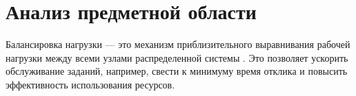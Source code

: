 \chapter{Анализ предметной области}

\begin{comment}
С ростом числа запросов к системе, встает вопрос о ее масштабировании.
Масштабирование — это процесс роста системы со временем, для эффективной
обработки все большего и большего количества запросов в единицу времени \cite{mashtab}.
Выделяют два вида масштабирования: горизонтальное и вертикальное \cite{uzel,mashtabtypes1,mashtabtypes2}. Вертикальное масштабирование происходит за счет увеличения мощности
вычислительного узла. Однако, использования только такого подхода часто
не хватает, поскольку постоянно увеличивая мощность, однажды будет до-
стигнут «потолок» производительности и дальнейшие аппаратные улучшения
будут недоступны. В таком случае для дальнейшего роста производительности
применяют горизонтальное масштабирование, которое заключается в добавле-
нии новых вычислительных узлов, выполняющих одинаковые функции. Для
расширения возможностей горизонтального масштабирования используются
балансировщики нагрузки \cite{mashtabtypes1,mashtabtypes2}.
\end{comment}

Балансировка нагрузки --- это механизм приблизительного выравнивания рабочей нагрузки между всеми узлами распределенной системы \cite{anal}.
Это позволяет ускорить обслуживание заданий, например, свести к минимуму время отклика и повысить эффективность использования ресурсов.
\begin{comment}
	
Некоторые из основных целей алгоритма балансировки нагрузки, как указано в, заключаются в следующем: добиться большего общего улучшения производительности системы при разумных затратах, например, сократить время отклика задачи при сохранении приемлемых задержек; одинаково относиться ко всем заданиям в системе независимо от их происхождения; обладать отказоустойчивостью:
выносливостью производительности при частичном сбое в системе; иметь возможность модифицировать себя в соответствии с любыми изменениями или расширяться в конфигурации распределенной системы; и поддерживать стабильность системы: способность учитывать чрезвычайные ситуации, такие как внезапный всплеск поступлений, чтобы производительность системы не ухудшалась сверх определенного порога, одновременно предотвращая, чтобы узлы распределенной системы тратили слишком много времени на передачу заданий между собой вместо выполнения эти рабочие места. \cite{4}	

Cледует еще четко понимать, о чем идет речь: о распределении или балансировке нагрузки. Несмотря на свою схожесть, эти понятия нельзя назвать взаимозаменяемыми. Так, распределение нагрузки предполагает ее равномерное разделение между серверами. А вот балансировка – это уже ее частный случай, учитывающий ряд факторов, подверженных изменению. \cite{4}
\end{comment}
